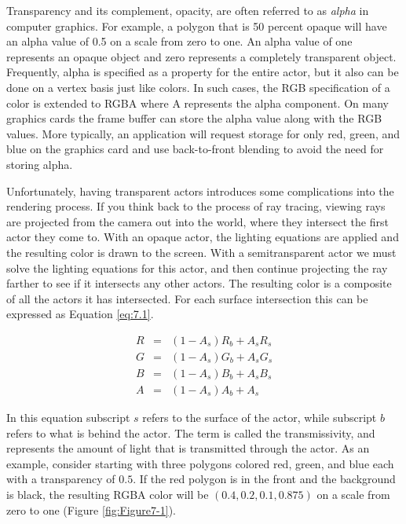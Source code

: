 Transparency and its complement, opacity, are often referred to as \emph{alpha} in computer graphics. For example, a polygon that is 50 percent opaque will have an alpha value of 0.5 on a scale from zero to one. An alpha value of one represents an opaque object and zero represents a completely transparent object. Frequently, alpha is specified as a property for the entire actor, but it also can be done on a vertex basis just like colors. In such cases, the RGB specification of a color is extended to RGBA where A represents the alpha component. On many graphics cards the frame buffer can store the alpha value along with the RGB values. More typically, an application will request storage for only red, green, and blue on the graphics card and use back-to-front blending to avoid the need for storing alpha.

Unfortunately, having transparent actors introduces some complications into the rendering process. If you think back to the process of ray tracing, viewing rays are projected from the camera out into the world, where they intersect the first actor they come to. With an opaque actor, the lighting equations are applied and the resulting color is drawn to the screen. With a semitransparent actor we must solve the lighting equations for this actor, and then continue projecting the ray farther to see if it intersects any other actors. The resulting color is a composite of all the actors it has intersected. For each surface intersection this can be expressed as Equation \ref{eq:7.1}.

\begin{equation}\label{eq:7.1}
\begin{array}{lll}
R &=& (1 - A_s) R_b + A_s R_s\\
G &=& (1 - A_s) G_b + A_s G_s\\
B &=& (1 - A_s) B_b + A_s B_s\\
A &=& (1 - A_s) A_b + A_s
\end{array}
\end{equation}

In this equation subscript $s$ refers to the surface of the actor, while subscript $b$ refers to what is behind the actor. The term is called the transmissivity, and represents the amount of light that is transmitted through the actor. As an example, consider starting with three polygons colored red, green, and blue each with a transparency of $0.5$. If the red polygon is in the front and the background is black, the resulting RGBA color will be $(0.4, 0.2, 0.1, 0.875)$ on a scale from zero to one (Figure \ref{fig:Figure7-1}).

